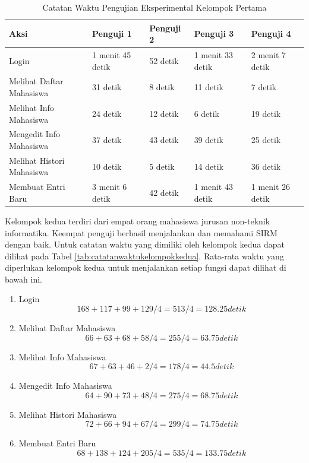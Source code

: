 \begin{table}[h]
\centering
\caption[Tabel 5-2 Catatan Waktu Pengujian Eksperimental Kelompok
Pertama]{Catatan Waktu Pengujian Eksperimental Kelompok Pertama}
\label{tab:catatanwaktukelompokpertama}
\begin{tabular}{|p{3cm}|p{1.5cm}|p{1.5cm}|p{1.5cm}|p{1.5cm}|}
\hline
Aksi & Penguji 1 & Penguji 2 & Penguji 3 & Penguji 4\\
\hline
Login & 1 menit 45 detik & 52 detik & 1 menit 33 detik & 2 menit 7 detik\\
\hline
Melihat Daftar Mahasiswa & 31 detik & 8 detik & 11 detik & 7 detik\\
\hline
Melihat Info Mahasiswa & 24 detik & 12 detik & 6 detik & 19 detik\\
\hline
Mengedit Info Mahasiswa & 37 detik & 43 detik & 39 detik & 25 detik\\
\hline
Melihat Histori Mahasiswa & 10 detik & 5 detik & 14 detik & 36 detik\\
\hline
Membuat Entri Baru & 3 menit 6 detik & 42 detik & 1 menit 43 detik & 1 menit
26 detik\\
\hline
\end{tabular}
\end{table}

Kelompok kedua terdiri dari empat orang mahasiswa jurusan non-teknik
informatika. Keempat penguji berhasil menjalankan dan memahami SIRM dengan baik.
Untuk catatan waktu yang dimiliki oleh kelompok kedua dapat dilihat pada Tabel
\ref{tab:catatanwaktukelompokkedua}. Rata-rata waktu yang diperlukan
kelompok kedua untuk menjalankan setiap fungsi dapat dilihat di bawah ini.
\begin{enumerate}[1]
  \item Login\\
  $$168 + 117 + 99 + 129 / 4 = 513 / 4 = 128.25 detik$$
  \item Melihat Daftar Mahasiswa
  $$66 + 63 + 68 + 58 / 4 = 255 / 4 = 63.75 detik$$
  \item Melihat Info Mahasiswa
  $$67 + 63 + 46 + 2 / 4 = 178 / 4 = 44.5 detik$$
  \item Mengedit Info Mahasiswa
  $$64 + 90 + 73 + 48 / 4 = 275 / 4 = 68.75 detik$$
  \item Melihat Histori Mahasiswa
  $$72 + 66 + 94 + 67 / 4 = 299 / 4 = 74.75 detik$$
  \item Membuat Entri Baru
  $$68 + 138 + 124 + 205 / 4 = 535 / 4 = 133.75 detik$$
\end{enumerate}


